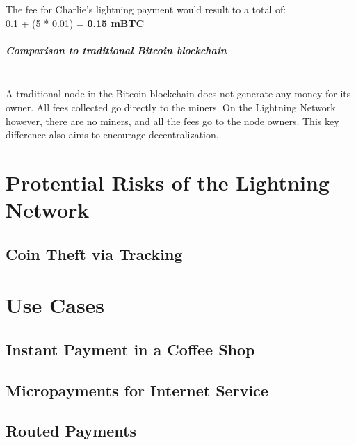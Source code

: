 \documentclass[a4paper, 12pt]{report}
\begin{document}
The fee for Charlie’s lightning payment would result to a total of:\\
0.1 + (5 * 0.01) = \textbf{0.15 mBTC}

\paragraph{Comparison to traditional Bitcoin blockchain} \hspace{0pt} \\
A traditional node in the Bitcoin blockchain does not generate any money for its owner. All fees collected go directly to the miners. On the Lightning Network however, there are no miners, and all the fees go to the node owners. This key difference also aims to encourage decentralization.

\chapter{Protential Risks of the Lightning Network}
\section{Coin Theft via Tracking}

\chapter{Use Cases}
\section{Instant Payment in a Coffee Shop}
\section{Micropayments for Internet Service}
\section{Routed Payments}
\end{document}
